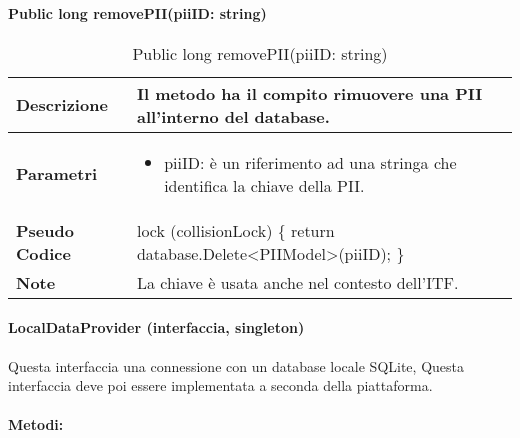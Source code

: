     \paragraph{Public long removePII(piiID: string)}
    \begin{center}
        \begin{longtable}{|p{3cm}|p{9cm}|}%
        \caption{Public long removePII(piiID: string)}
        \label{tab:public-long-removepii}
        \endfirsthead
        \endhead
        \hline
        \textbf{Descrizione} & Il metodo ha il compito rimuovere una PII all’interno del database. \\
        \hline
        \textbf{Parametri} &      
        \begin{itemize}
            \item piiID: è un riferimento ad una stringa che identifica la chiave della PII.
        \end{itemize}
        \\
        \hline
        \textbf{Pseudo Codice} & 
        lock (collisionLock)\newline
        \{\newline
            return database.Delete<PIIModel>(piiID);\newline
        \}\newline
        \\
        \hline
        \textbf{Note} & 
        La chiave è usata anche nel contesto dell’ITF.
        \\
        \hline
        \end{longtable}
        \end{center}

\paragraph{LocalDataProvider (interfaccia, singleton)}
Questa interfaccia una connessione con un database locale SQLite, Questa interfaccia deve poi essere implementata a seconda della piattaforma.
\paragraph{Metodi:}

